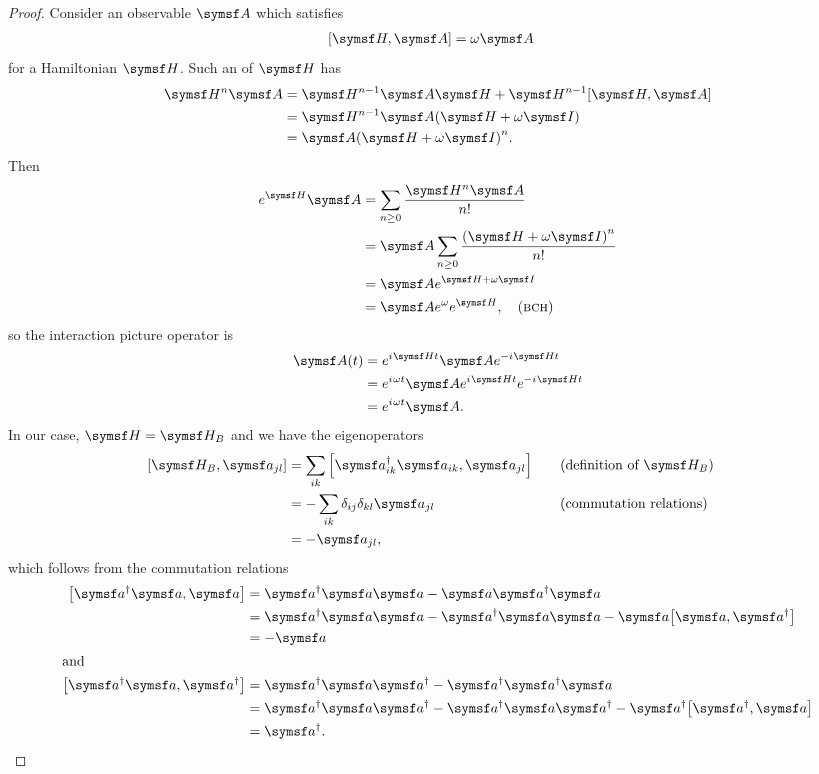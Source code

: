 \documentclass[../thesis.tex]{subfiles}
\begin{document}
\begin{proof}
  Consider an observable $\opr{A}$ which satisfies
  \begin{align}
    \comm{\ham}{\opr{A}} &= \omega\opr{A}
  \end{align}
  for a Hamiltonian $\ham$. Such an  of $\ham$ has
  \begin{align}
    \ham^n\opr{A}
    &= \ham^{n-1}\opr{A}\ham + \ham^{n-1}\comm{\ham}{\opr{A}} \\
    &= \ham^{n-1}\opr{A}\qty(\ham + \omega\idopr) \\
    &= \opr{A}{\qty(\ham + \omega\idopr)}^n.
  \end{align}
  Then
  \begin{align}
    e^{\ham} \opr{A}
    &= \sum_{n \ge 0} \frac{\ham^n \opr{A}}{n!} \\
    &= \opr{A} \sum_{n \ge 0} \frac{{\qty(\ham + \omega\idopr)}^n}{n!} \\
    &= \opr{A} e^{\ham + \omega\idopr} \\
    &= \opr{A} e^{\omega} e^{\ham}, \by{\textsc{bch}}
  \end{align}
  so the interaction picture operator is
  \begin{align}
    \opr{A}(t)
  &= e^{\im\ham t} \opr{A} e^{-\im\ham t} \\
  &= e^{\im\omega t} \opr{A} e^{\im\ham t}e^{-\im\ham t} \\
  &= e^{\im\omega t} \opr{A}.
  \end{align}
  In our case, $\ham = \ham_B$ and we have the eigenoperators
  \begin{alignat}{2}
    \comm{\ham_B}{\opr{a}_{jl}}
  &=
  \sum_{ik} \comm{\opr{a}_{ik}^\dag\opr{a}_{ik}}{\opr{a}_{jl}}
  && \by{definition of $\ham_B$}
  \\
  &= -\sum_{ik} \delta_{ij}\delta_{kl} \opr{a}_{jl}
  && \by{commutation relations}
  \\
  &= -\opr{a}_{jl},
  \end{alignat}
  which follows from the commutation relations
  \begin{align}
    \comm{\opr{a}^\dag\opr{a}}{\opr{a}}
  &= \opr{a}^\dag\opr{a}\opr{a} - \opr{a}\opr{a}^\dag \opr{a} \\
  &=
  \opr{a}^\dag\opr{a}\opr{a} - \opr{a}^\dag\opr{a} \opr{a} -
  \opr{a}\comm{\opr{a}}{\opr{a}^\dag} \\
  &= -\opr{a}
  \\
  \shortintertext{and}
  \comm{\opr{a}^\dag\opr{a}}{\opr{a}^\dag}
  &= \opr{a}^\dag\opr{a}\opr{a}^\dag - \opr{a}^\dag\opr{a}^\dag \opr{a} \\
  &= \opr{a}^\dag\opr{a}\opr{a}^\dag - \opr{a}^\dag\opr{a}\opr{a}^\dag
  - \opr{a}^\dag\comm{\opr{a}^\dag}{\opr{a}} \\
  &= \opr{a}^\dag.
  \qedhere
  \end{align}
\end{proof}
\end{document}
